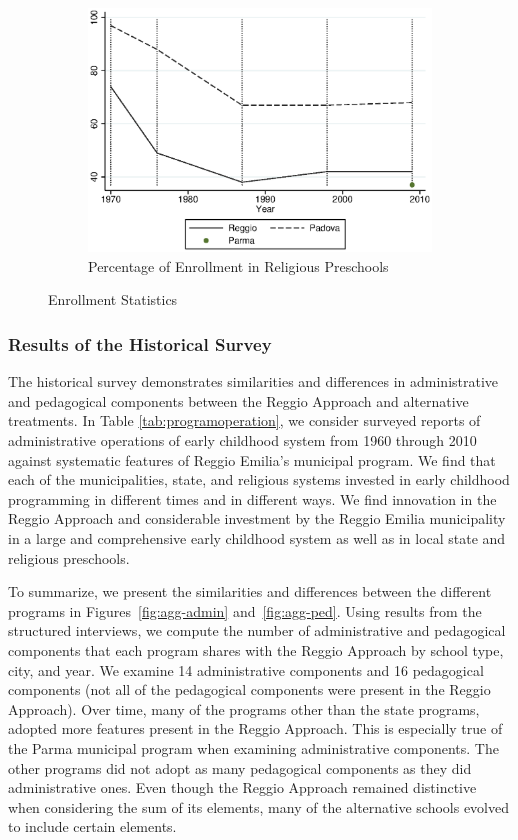 \begin{figure}[H]
\begin{subfigure}[ht]{0.48\textwidth}
        \includegraphics[width=\textwidth]{../../output/image/enroll_per_priv_graph.eps}
        \caption{Percentage of Enrollment in Religious Preschools}
        \label{fig:large}
      \end{subfigure}
      \caption{Enrollment Statistics}  \label{fig:enrollment}
    \end{figure}

\subsubsection{Results of the Historical Survey}

The historical survey demonstrates similarities and differences in administrative and pedagogical components between the Reggio Approach and alternative treatments. In Table \ref{tab:programoperation}, we consider surveyed reports of administrative operations of early childhood system from 1960 through 2010 against systematic features of Reggio Emilia's municipal program. We find that each of the municipalities, state, and religious systems invested in early childhood programming in different times and in different ways. We find innovation in the Reggio Approach and considerable investment by the Reggio Emilia municipality in a large and comprehensive early childhood system as well as in local state and religious preschools. 


To summarize, we present the similarities and differences between the different programs in Figures~\ref{fig:agg-admin} and~\ref{fig:agg-ped}. Using results from the structured interviews, we compute the number of administrative and pedagogical components that each program shares with the Reggio Approach by school type, city, and year. We examine 14 administrative components and 16 pedagogical components (not all of the pedagogical components were present in the Reggio Approach). Over time, many of the programs other than the state programs, adopted more features present in the Reggio Approach. This is especially true of the Parma municipal program when examining administrative components. The other programs did not adopt as many pedagogical components as they did administrative ones. Even though the Reggio Approach remained distinctive when considering the sum of its elements, many of the alternative schools evolved to include certain elements.

